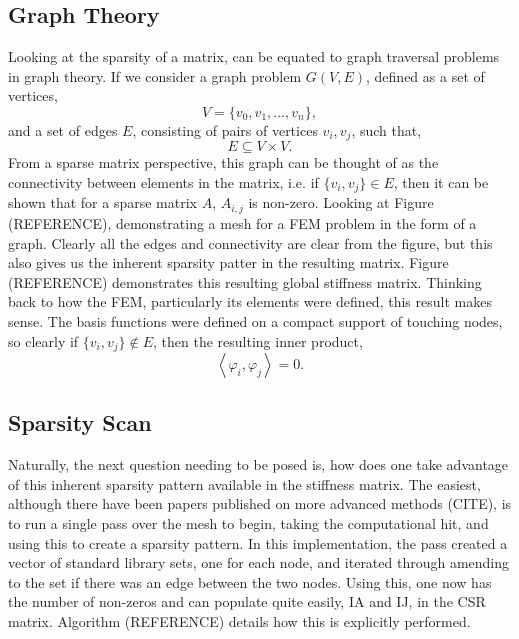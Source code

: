 \subsection{Graph Theory}

Looking at the sparsity of a matrix, can be equated to graph traversal problems in graph theory. If we consider a graph problem $G(V,E)$, defined as a set of vertices,
\begin{equation}
	V = \{v_0,v_1,\dots,v_n\},
\end{equation}
and a set of edges $E$, consisting of pairs of vertices $v_i,v_j$, such that,
\begin{equation}
	E \subseteq V\times V.
\end{equation}
From a sparse matrix perspective, this graph can be thought of as the connectivity between elements in the matrix, i.e. if $\{v_i,v_j\} \in E$, then it can be shown that for a sparse matrix $A$, $A_{i,j}$ is non-zero. Looking at Figure (REFERENCE), demonstrating a mesh for a FEM problem in the form of a graph. Clearly all the edges and connectivity are clear from the figure, but this also gives us the inherent sparsity patter in the resulting matrix. Figure (REFERENCE) demonstrates this resulting global stiffness matrix. Thinking back to how the FEM, particularly its elements were defined, this result makes sense. The basis functions were defined on a compact support of touching nodes, so clearly if $\{v_i,v_j\} \notin E$, then the resulting inner product,
\begin{equation}
	\left\langle \varphi_i, \varphi_j \right\rangle = 0.
\end{equation}

\subsection{Sparsity Scan}

Naturally, the next question needing to be posed is, how does one take advantage of this inherent sparsity pattern available in the stiffness matrix. The easiest, although there have been papers published on more advanced methods (CITE), is to run a single pass over the mesh to begin, taking the computational hit, and using this to create a sparsity pattern. In this implementation, the pass created a vector of standard library sets, one for each node, and iterated through amending to the set if there was an edge between the two nodes. Using this, one now has the number of non-zeros and can populate quite easily, IA and IJ, in the CSR matrix. Algorithm (REFERENCE) details how this is explicitly performed.

